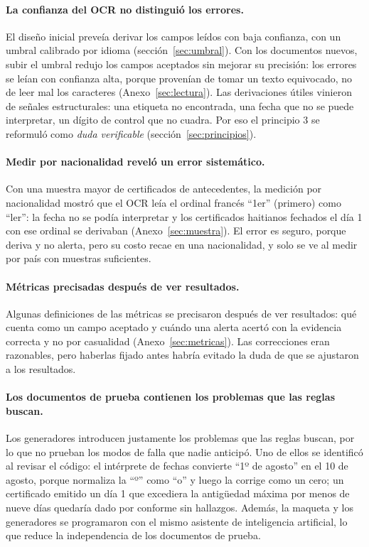 \documentclass[11pt,a4paper]{article}
\begin{document}
\paragraph{La confianza del OCR no distinguió los errores.} El diseño inicial preveía derivar los campos leídos con baja confianza, con un umbral calibrado por idioma (sección~\ref{sec:umbral}). Con los documentos nuevos, subir el umbral redujo los campos aceptados sin mejorar su precisión: los errores se leían con confianza alta, porque provenían de tomar un texto equivocado, no de leer mal los caracteres (Anexo~\ref{sec:lectura}). Las derivaciones útiles vinieron de señales estructurales: una etiqueta no encontrada, una fecha que no se puede interpretar, un dígito de control que no cuadra. Por eso el principio 3 se reformuló como \emph{duda verificable} (sección~\ref{sec:principios}).

\paragraph{Medir por nacionalidad reveló un error sistemático.} Con una muestra mayor de certificados de antecedentes, la medición por nacionalidad mostró que el OCR leía el ordinal francés ``1er'' (primero) como ``ler'': la fecha no se podía interpretar y los certificados haitianos fechados el día 1 con ese ordinal se derivaban (Anexo~\ref{sec:muestra}). El error es seguro, porque deriva y no alerta, pero su costo recae en una nacionalidad, y solo se ve al medir por país con muestras suficientes.

\paragraph{Métricas precisadas después de ver resultados.} Algunas definiciones de las métricas se precisaron después de ver resultados: qué cuenta como un campo aceptado y cuándo una alerta acertó con la evidencia correcta y no por casualidad (Anexo~\ref{sec:metricas}). Las correcciones eran razonables, pero haberlas fijado antes habría evitado la duda de que se ajustaron a los resultados.

\paragraph{Los documentos de prueba contienen los problemas que las reglas buscan.} Los generadores introducen justamente los problemas que las reglas buscan, por lo que no prueban los modos de falla que nadie anticipó. Uno de ellos se identificó al revisar el código: el intérprete de fechas convierte ``1º de agosto'' en el 10 de agosto, porque normaliza la ``º'' como ``o'' y luego la corrige como un cero; un certificado emitido un día 1 que excediera la antigüedad máxima por menos de nueve días quedaría dado por conforme sin hallazgos. Además, la maqueta y los generadores se programaron con el mismo asistente de inteligencia artificial, lo que reduce la independencia de los documentos de prueba.
\end{document}

